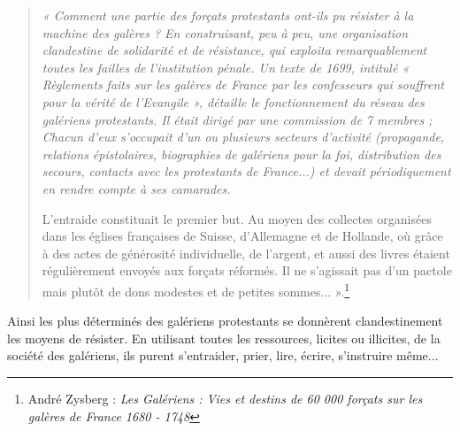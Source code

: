 



\vspace*{1.55cm}

\begin{quote}
\itshape
« Comment une partie des forçats protestants ont-ils pu résister à la machine des
galères ? En construisant, peu à peu, une organisation clandestine de solidarité et de
résistance, qui exploita remarquablement toutes les failles de l’institution pénale. Un
texte de 1699, intitulé « Règlements faits sur les galères de France par les
confesseurs qui souffrent pour la vérité de l’Evangile », détaille le fonctionnement du
réseau des galériens protestants. Il était dirigé par une commission de 7 membres ;
Chacun d’eux s’occupait d’un ou plusieurs secteurs d’activité (propagande,
relations épistolaires, biographies de galériens pour la foi, distribution des secours,
contacts avec les protestants de France...) et devait périodiquement en rendre
compte à ses camarades.

L’entraide constituait le premier but. Au moyen des collectes organisées dans les
églises françaises de Suisse, d’Allemagne et de Hollande, où grâce à des actes de
générosité individuelle, de l’argent, et aussi des livres étaient régulièrement envoyés
aux forçats réformés. Il ne s’agissait pas d’un pactole mais plutôt de dons modestes
et de petites sommes... ».\footnote{André Zysberg : \textit{Les Galériens : Vies et destins de 60 000
forçats sur les galères de France 1680 - 1748}}
\end{quote}

Ainsi les plus déterminés des galériens protestants se donnèrent clandestinement les
moyens de résister. En utilisant toutes les ressources, licites ou illicites, de la société
des galériens, ils purent s’entraider, prier, lire, écrire, s’instruire même...

\vspace{0.25em}


